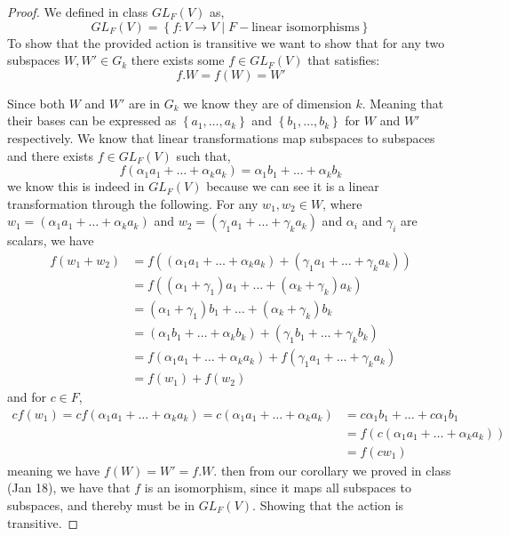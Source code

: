 \documentclass[11pt]{article}
\newcommand{\set}[1]{\left\{#1\right\}} %
\begin{document}
\begin{proof}
  We defined in class $GL_F(V)$ as,
  \[GL_F(V) = \set{f: V \rightarrow V \mid F-\text{linear isomorphisms}}\]
  To show that the provided action is transitive we want to show that for any two subspaces $W,W' \in G_k$ there exists some $f \in GL_F(V)$ that satisfies:
  \[f.W = f(W) =  W'\]

  Since both $W$ and $W'$ are in $G_k$ we know they are of dimension $k$. Meaning that their bases can be expressed as $\set{a_1, \dots , a_k}$ and $\set{b_1, \dots ,b_k}$ for $W$ and $W'$ respectively. We know that linear transformations map subspaces to subspaces and there exists $f\in GL_F(V)$ such that,
  \[f(\alpha_1a_1 + \dots + \alpha_ka_k) = \alpha_1b_1 + \dots +\alpha_kb_k\]
  we know this is indeed in $GL_F(V)$ because we can see it is a linear transformation through the following. For any $w_1,w_2 \in W $, where $w_1 = (\alpha_1a_1 + \dots + \alpha_ka_k)$ and $w_2 = (\gamma_1a_1 + \dots + \gamma_ka_k )$ and $\alpha_i$ and $\gamma_i$ are scalars, we have
 \begin{align*}
  f(w_1 + w_2) &= f((\alpha_1a_1 + \dots + \alpha_ka_k) + (\gamma_1a_1 + \dots + \gamma_ka_k )) \\&= f((\alpha_1 + \gamma_1)a_1 + \dots + (\alpha_k + \gamma_k)a_k) \\
  &= (\alpha_1 + \gamma_1)b_1 + \dots + (\alpha_k + \gamma_k)b_k \\
  &=(\alpha_1b_1 + \dots + \alpha_kb_k) + (\gamma_1b_1 + \dots + \gamma_kb_k ) \\
  &= f(\alpha_1a_1 + \dots + \alpha_ka_k) + f(\gamma_1a_1 + \dots + \gamma_ka_k) \\
  &= f(w_1) + f(w_2)
 \end{align*}
 and for $c \in F$,
 \begin{align*}
   cf(w_1) =cf(\alpha_1a_1 + \dots + \alpha_ka_k) = c(\alpha_1a_1 + \dots + \alpha_ka_k) &= c\alpha_1b_1 + \dots + c\alpha_1b_1 \\
   &= f(c(\alpha_1a_1 + \dots + \alpha_ka_k)) \\
   &= f(cw_1)
 \end{align*}
 meaning we have $f(W) = W' = f.W$.
 then from our corollary we proved in class (Jan 18), we have that $f$ is an isomorphism, since it maps all subspaces to subspaces, and thereby must be in $GL_F(V)$. Showing that the action is transitive.
\end{proof}
\end{document}
